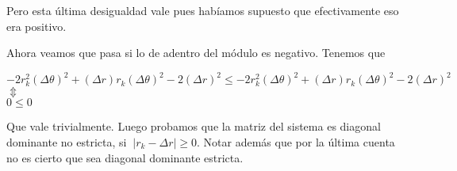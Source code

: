 Pero esta última desigualdad vale pues habíamos supuesto que efectivamente eso era positivo.

Ahora veamos que pasa si lo de adentro del módulo es negativo. Tenemos que 

\begin{center}
$-2 r_k^2 (\Delta \theta)^2 + (\Delta r) r_k (\Delta \theta)^2 - 2 (\Delta r)^2 \leq
-2 r_k^2 (\Delta \theta)^2 + (\Delta r) r_k (\Delta \theta)^2 - 2 (\Delta r)^2$ \\
$\Updownarrow$\\
$0 \leq 0$\\
\end{center}

Que vale trivialmente. Luego probamos que la matriz del sistema es diagonal dominante no estricta, si $~{\left\vert r_k - \Delta r \right\vert \geq 0}$. Notar además que por la última cuenta no es cierto que sea diagonal dominante estricta.